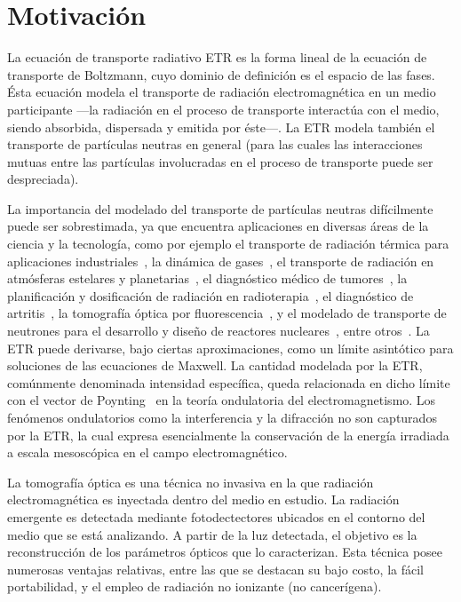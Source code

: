 \bigskip
\section{Motivación}

La ecuación de transporte radiativo ETR es la forma lineal de la ecuación de transporte de Boltzmann, 
cuyo dominio de definición es el espacio de las fases. Ésta ecuación modela el transporte 
de radiación electromagnética en un medio participante ---la radiación en el proceso de transporte 
interactúa con el medio, siendo absorbida, dispersada y emitida por éste---. La ETR modela también el transporte de partículas neutras en
 general (para las cuales las interacciones mutuas entre las partículas involucradas 
 en el proceso de transporte puede ser despreciada).

La importancia del modelado del transporte de partículas neutras 
difícilmente puede ser sobrestimada, ya que encuentra aplicaciones 
en diversas áreas de la ciencia y la tecnología, 
como por ejemplo el transporte de radiación 
 térmica para aplicaciones industriales~\cite{Howell2010, Thynell1998}, 
 la dinámica de gases~\cite{Duderstadt1979}, 
 el transporte de radiación en atmósferas estelares y 
 planetarias~\cite{Qin2015, Dymond1997, Chandrasekhar1960}, 
 el diagnóstico médico de tumores~\cite{Zhu2005, Zhu2010, Fujii2016b}, 
 la planificación y dosificación de radiación en radioterapia~\cite{Vassiliev2010,Bedford2019}, 
 el diagnóstico de artritis~\cite{Klose2002, Netz2001}, 
 la tomografía óptica por fluorescencia~\cite{Klose2005,Klose2010, Ren2010},
 y el modelado de transporte de neutrones para el desarrollo 
 y diseño de reactores nucleares~\cite{Larsen2006, Sanchez1982, Anli2006}, 
 entre otros~\cite {Mishchenko1999, Prasher2003}. 
 La ETR puede derivarse, bajo ciertas aproximaciones, como un límite asintótico 
 para soluciones de las ecuaciones de Maxwell. La cantidad modelada por la ETR, comúnmente denominada 
 intensidad específica, queda relacionada en dicho límite con el vector de Poynting~\cite{Mishchenko2002, Ripoll2011} 
 en la teoría ondulatoria del electromagnetismo. Los fenómenos ondulatorios como la interferencia y la difracción no son
 capturados por la ETR, la cual expresa esencialmente la conservación de la
 energía irradiada a escala mesoscópica en el campo electromagnético.

  
 La tomografía óptica es una técnica no invasiva en la que
 radiación electromagnética es inyectada dentro del medio
 en estudio.
 La radiación emergente es detectada mediante fotodectectores 
 ubicados en el contorno del medio que se está analizando. 
 A partir de la luz detectada, el objetivo es la reconstrucción de
 los parámetros ópticos que lo caracterizan. 
Esta técnica posee numerosas 
 ventajas relativas, entre las que se destacan su bajo costo, la fácil portabilidad, y 
 el empleo de radiación no ionizante (no cancerígena). 
 
